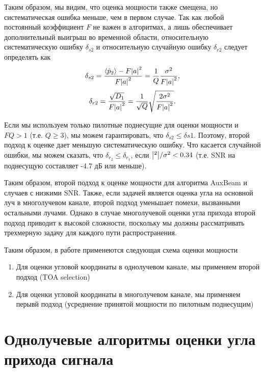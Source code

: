 Таким образом, мы видим, что оценка мощности также смещена, но систематическая
ошибка меньше, чем в первом случае.
Так как любой постоянный коэффициент $F$ не важен в алгоритмах, а
лишь обеспечивает дополнительный выигрыш во временной области, относительную
систематическую ошибку $\delta_{s2}$ и относительную случайную ошибку $\delta_{r2}$ следует
определять как
\begin{equation}
    \delta_{s2} = \frac{\langle \hat p_2 \rangle - F \abs{a}^2}{F \abs{a}^2} = \frac{1}{Q} \frac{\sigma^2}{F\abs{a}^2},
\end{equation}
\begin{equation}
    \delta_{r2} = \frac{\sqrt{D_1}}{F\abs{a}^2} = \frac{1}{\sqrt Q} \sqrt{\frac{2\sigma^2}{F\abs{a}^2}}.
\end{equation}

Если мы используем только пилотные поднесущие для оценки мощности и $FQ > 1$ (т.е. $Q\geq 3$),
мы можем гарантировать, что $\delta_{s2} \leq \delta{s1}$. Поэтому, второй подход к оценке дает меньшую
систематическую ошибку. Что касается случайной ошибки, мы можем сказать, что $\delta_{r_2} \leq \delta_{r_1}$, если
$\abs{^2}/\sigma^2 < 0.34$ (т.е. SNR на поднесущую составляет -4.7 дБ или меньше).

Таким образом, второй подход к оценке мощности для алгоритма AuxBeam и случаев с
низкими SNR. Также, если задачей является оценка угла на основной луч в
многолучевом канале, второй подход уменьшает помехи, вызванными остальными лучами.
Однако в случае многолучевой оценки угла прихода второй подход приводит к
высокой сложности, поскольку мы должны рассматривать трехмерную задачу для
каждого пути распространения.

Таким образом, в работе применеются следующая схема оценки мощности
\begin{enumerate}
    \item Для оценки угловой координаты в однолучевом канале, мы применяем второй подход (TOA selection) \\
    \item Для оценки угловой координаты в многолучевом канале, мы применяем перывй подход (усреднение принятой мощности по пилотным поднесущим) \\
\end{enumerate}

\section{Однолучевые алгоритмы оценки угла прихода сигнала}
